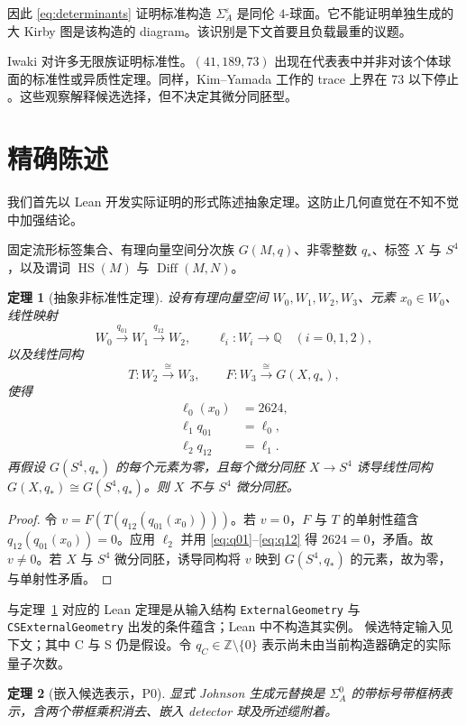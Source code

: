 \documentclass[11pt]{amsart}
\newtheorem{theorem}{定理}[section]
\theoremstyle{definition}
\theoremstyle{remark}
\newcommand{\Q}{\mathbb{Q}}
\begin{document}
因此 \eqref{eq:determinants} 证明标准构造 $\Sigma_A^\varepsilon$ 是同伦 $4$-球面。它不能证明单独生成的大 Kirby 图是该构造的 diagram。该识别是下文首要且负载最重的议题。

Iwaki 对许多无限族证明标准性。$(41,189,73)$ 出现在代表表中并非对该个体球面的标准性或异质性定理。同样，Kim--Yamada 工作的 trace 上界在 73 以下停止 \cite{KimYamada2017}。这些观察解释候选选择，但不决定其微分同胚型。
\section{精确陈述}

我们首先以 Lean 开发实际证明的形式陈述抽象定理。这防止几何直觉在不知不觉中加强结论。

固定流形标签集合、有理向量空间分次族 $G(M,q)$、非零整数 $q_*$、标签 $X$ 与 $S^4$，以及谓词
\(\operatorname{HS}(M)\) 与 \(\operatorname{Diff}(M,N)\)。

\begin{theorem}[抽象非标准性定理]\label{thm:A}
设有有理向量空间 $W_0,W_1,W_2,W_3$、元素 $x_0\in W_0$、线性映射
\[
W_0\xrightarrow{q_{01}}W_1\xrightarrow{q_{12}}W_2,
\qquad
\ell_i:W_i\longrightarrow\Q\quad (i=0,1,2),
\]
以及线性同构
\[
T:W_2\xrightarrow{\cong}W_3,
\qquad
F:W_3\xrightarrow{\cong}G(X,q_*),
\]
使得
\begin{align}
\ell_0(x_0)&=2624,\label{eq:value}\\
\ell_1q_{01}&=\ell_0,\label{eq:q01}\\
\ell_2q_{12}&=\ell_1.\label{eq:q12}
\end{align}
再假设 $G(S^4,q_*)$ 的每个元素为零，且每个微分同胚 $X\to S^4$ 诱导线性同构
\(G(X,q_*)\cong G(S^4,q_*)\)。则 $X$ 不与 $S^4$ 微分同胚。
\end{theorem}

\begin{proof}
令 $v=F(T(q_{12}(q_{01}(x_0))))$。若 $v=0$，$F$ 与 $T$ 的单射性蕴含 $q_{12}(q_{01}(x_0))=0$。应用 $\ell_2$ 并用 \eqref{eq:q01}--\eqref{eq:q12} 得 $2624=0$，矛盾。故 $v\ne0$。若 $X$ 与 $S^4$ 微分同胚，诱导同构将 $v$ 映到 $G(S^4,q_*)$ 的元素，故为零，与单射性矛盾。
\end{proof}

与定理~\ref{thm:A} 对应的 Lean 定理是从输入结构 \texttt{ExternalGeometry} 与
\texttt{CSExternalGeometry} 出发的条件蕴含；Lean 中不构造其实例。
候选特定输入见下文；其中 C 与 S 仍是假设。令
$q_C\in\mathbb Z\setminus\{0\}$ 表示尚未由当前构造器确定的实际量子次数。

\begin{theorem}[嵌入候选表示，P0]\label{hyp:P0}
显式 Johnson 生成元替换是 $\Sigma_A^0$ 的带标号带框柄表示，含两个带框乘积消去、嵌入 detector 球及所述缆附着。
\end{theorem}
\end{document}
